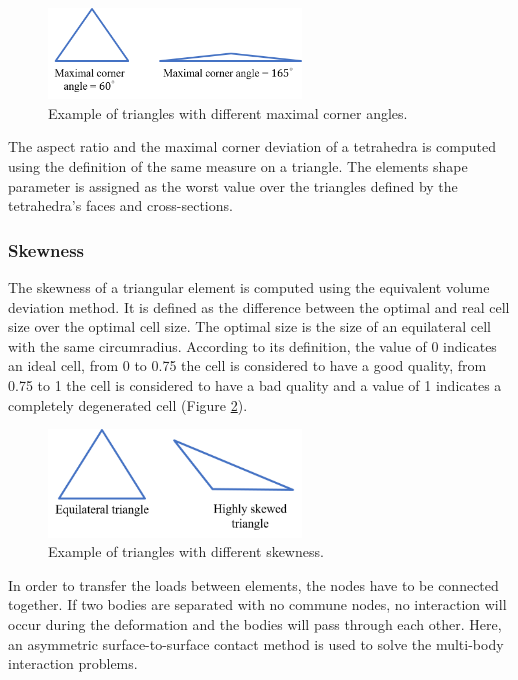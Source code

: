  \begin{figure}[!h]
\centering
\includegraphics[width=0.6\textwidth,keepaspectratio]{figures/maximalcornerangle.png} 
\caption{Example of triangles with different maximal corner angles.}
\label{fig:cornerangle}
\end{figure} 

The aspect ratio and the maximal corner deviation of a tetrahedra is computed using the definition of the same measure on a triangle. The elements shape parameter is assigned as the worst value over the triangles defined by the tetrahedra's faces and cross-sections.  

\subsubsection*{Skewness }
The skewness of a triangular element is computed using the equivalent volume deviation method. It is defined as the difference between the optimal and real cell size over the optimal cell size. The optimal size is the size of an equilateral cell with the same circumradius. According to its definition, the value of 0 indicates an ideal cell, from 0 to 0.75 the cell is considered to have a good quality, from 0.75 to 1 the cell is considered to have a bad quality and a value of 1 indicates a completely degenerated cell (Figure \ref{fig:skewness}).   

 \begin{figure}[!h]
\centering
\includegraphics[width=0.6\textwidth,keepaspectratio]{figures/skewness.png} 
\caption{Example of triangles with different skewness.}
\label{fig:skewness}
\end{figure}
 
\label{section:contactmechanics}

In order to transfer the loads between elements, the nodes have to be connected together. If two bodies are separated with no commune nodes, no interaction will occur during the deformation and the bodies will pass through each other. Here, an asymmetric surface-to-surface contact method is used to solve the multi-body interaction problems.

